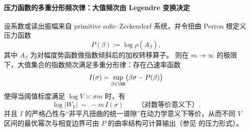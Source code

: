 \paragraph{压力函数的多重分形频次律：大值频次由 Legendre 变换决定}
\begin{theorem}\label{thm:gm-multifractal-pressure-legendre}
设系数或读出振幅来自 primitive sofic--Zeckendorf 系统，并令扭曲 Perron 根定义压力函数
\[
P(\beta):=\log\rho(A_\beta),
\]
其中 \(A_\beta\) 为对幅度势函数做指数倾斜后的加权转移算子。
则在 \(m\to\infty\) 的极限下，大值集合的指数频次满足多重分形律：存在凸速率函数
\[
I(\sigma)=\sup_{\beta\in\RR}\bigl(\beta\sigma-P(\beta)\bigr)
\]
使得当阈值标度满足 \(\log V\asymp \sigma m\) 时，有
\[
\log |W_V|\ \sim\ -m\,I(\sigma)
\qquad\text{（对数等价意义下）}.
\]
并且 \(I\) 的严格凸性与“非平凡扭曲的统一谱隙”在动力学意义下等价，从而不同 \(V\) 区间的最优幂次与相变边界可由 \(P\) 的曲率结构可计算输出（参见 \cite{Ruelle1978Thermodynamic} 的压力形式）。
\end{theorem}

\endinput
